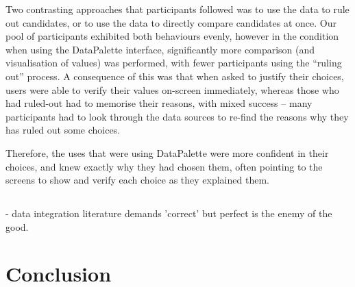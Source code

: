 \documentclass{sigchi}
\begin{document}
Two contrasting approaches that participants followed was to use the data to rule out candidates, or to use the data to
directly compare candidates at once. Our pool of participants exhibited both behaviours evenly, however in the condition
when using the DataPalette interface, significantly more comparison (and visualisation of values) was performed, with fewer
participants using the ``ruling out'' process. A consequence of this was that when asked to justify their choices, users were
able to verify their values on-screen immediately, whereas those who had ruled-out had to memorise their reasons, with
mixed success  -- many participants had to look through the data sources to re-find the reasons why they has ruled out some choices.

Therefore, the uses that were using DataPalette were more confident in their choices, and knew exactly why they had chosen them,
often pointing to the screens to show and verify each choice as they explained them.

\subsection{}

- data integration literature demands 'correct' but perfect is the enemy of the good.


%
%
%









\section{Conclusion} %

\end{document}
